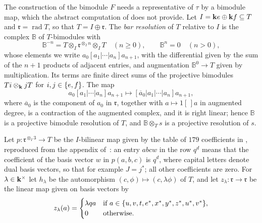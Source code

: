 The construction of the bimodule $F$ needs a representative of $\tau$ by a
bimodule map, which the abstract computation of  does not
provide. Let ${I=\mathbf{k} e\oplus\mathbf{k} f\subseteq T}$ and
${\mathfrak{r}=\operatorname{rad}
T}$, so that ${T=I\oplus\mathfrak{r}}$. The \emph{bar resolution} of $T$ relative
to $I$ is the complex $\mathbb{B}$ of $T$-bimodules with
\[
  \mathbb{B}^{-n}=T\otimes_I\mathfrak{r}^{\otimes_In}\otimes_IT\quad(n\geq0),
  \qquad\mathbb{B}^n=0\quad(n>0),
\]
whose elements we write $a_0[a_1|\cdots|a_n]a_{n+1}$, with the differential
given by the sum of the ${n+1}$ products of adjacent entries, and augmentation
${\mathbb{B}^0\to T}$ given by multiplication. Its terms are finite direct sums
of the projective bimodules ${Ti\otimes_{\mathbf{k}} jT}$ for ${i,j\in\set{e,f}}$. The map
\[
  a_0[a_1|\cdots|a_n]a_{n+1}\longmapsto[\overline{a}_0|a_1|\cdots|a_n]a_{n+1},
\]
where $\overline{a}_0$ is the component of $a_0$ in $\mathfrak{r}$, together
with ${a\mapsto1[\,]a}$ in augmented degree, is a contraction of the augmented
complex, and it is right linear; hence $\mathbb{B}$ is a projective bimodule
resolution of $T$, and ${\mathbb{B}\otimes_Ts}$ is a projective resolution of
$s$.

Let ${p\colon\mathfrak{r}^{\otimes_I3}\to T}$ be the $I$-bilinear map given by
the table of $179$ coefficients in , reproduced from the
appendix of~\cite{OAI26ar}: an entry $abcw$ in the row $q^d$ means that the
coefficient of the basis vector $w$ in $p(a,b,c)$ is $q^d$, where capital
letters denote dual basis vectors, so that for example ${J=j^*}$; all other
coefficients are zero. For ${\lambda\in\mathbf{k}^\times}$ let $h_\lambda$ be the
automorphism ${(c,\phi)\mapsto(c,\lambda\phi)}$ of $T$, and let
${z_\lambda\colon\mathfrak{r}\to\mathfrak{r}}$ be the linear map given on basis
vectors by
\[
  z_\lambda(a)=\begin{cases}
    \lambda qa&\text{if }a\in\set{u,v,t,e^*,x^*,y^*,z^*,u^*,v^*},\\
    0&\text{otherwise}.
  \end{cases}
\]

